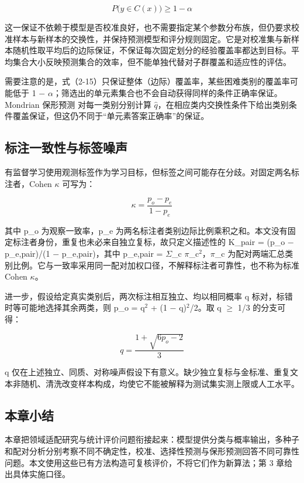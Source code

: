 \begin{equation}P\bigl(y\in C(x)\bigr)\ge 1-\alpha\tag{2-15}\label{eq:2-15}\end{equation}

这一保证不依赖于模型是否校准良好，也不需要指定某个参数分布族，但仍要求校准样本与新样本的交换性，并保持预测模型和评分规则固定。它是对校准集与新样本随机性取平均后的边际保证，不保证每次固定划分的经验覆盖率都达到目标。平均集合大小反映预测集合的效率，但不能单独代替对子群覆盖和适应性的评估。

需要注意的是，式（2-15）只保证整体（边际）覆盖率，某些困难类别的覆盖率可能低于 1 \(-\) \(\alpha\)；筛选出的单元素集合也不会自动获得同样的条件正确率保证。Mondrian 保形预测\cite{ref31} 对每一类别分别计算 \(\hat q\)，在相应类内交换性条件下给出类别条件覆盖保证，但这仍不同于``单元素答案正确率''的保证。

\FloatBarrier\subsection{标注一致性与标签噪声}

有监督学习使用观测标签作为学习目标，但标签之间可能存在分歧。对固定两名标注者，Cohen \(\kappa\) 可写为：

\begin{equation}\kappa=\frac{p_o-p_e}{1-p_e}\tag{2-16}\label{eq:2-16}\end{equation}

其中 p\_o 为观察一致率，p\_e 为两名标注者类别边际比例乘积之和。本文没有固定标注者身份，重复也未必来自独立复标，故只定义描述性的 K\_pair = (p\_o \(-\) p\_e,pair)/(1 \(-\) p\_e,pair)，其中 p\_e,pair = \(\Sigma\)\_c \(\pi\)\_c\(^{2}\)，\(\pi\)\_c 为配对两端汇总类别比例。它与一致率采用同一配对加权口径，不解释标注者可靠性，也不称为标准 Cohen \(\kappa\)。

进一步，假设给定真实类别后，两次标注相互独立、均以相同概率 q 标对，标错时等可能地选择其余两类，则 p\_o = q\(^{2}\) + (1 \(-\) q)\(^{2}\)/2。取 q \(\ge\) 1/3 的分支可得：

\begin{equation}q=\frac{1+\sqrt{6p_o-2}}{3}\tag{2-17}\label{eq:2-17}\end{equation}

q 仅在上述独立、同质、对称噪声假设下有意义。缺少独立复标与金标准、重复文本非随机、清洗改变样本构成，均使它不能被解释为测试集实测上限或人工水平。

\FloatBarrier\subsection{本章小结}

本章把领域适配研究与统计评价问题衔接起来：模型提供分类与概率输出，多种子和配对分析分别考察不同不确定性，校准、选择性预测与保形预测回答不同可靠性问题。本文使用这些已有方法构造可复核评价，不将它们作为新算法；第 3 章给出具体实施口径。
